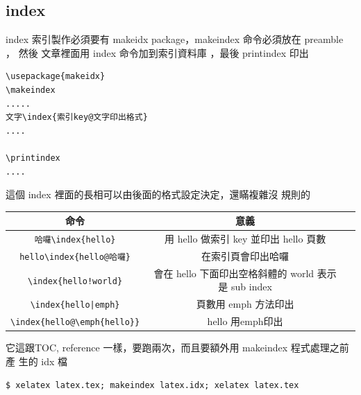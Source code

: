   \subsection{index}
  index 索引製作必須要有 makeidx package，makeindex 命令必須放在 preamble ，
  然後 文章裡面用 index 命令加到索引資料庫 ，最後 printindex 印出
  \begin{verbatim}
\usepackage{makeidx}
\makeindex
.....
文字\index{索引key@文字印出格式}
....

\printindex
....
  \end{verbatim}
  這個 index 裡面的長相可以由後面的格式設定決定，還瞞複雜沒
  規則的
  \begin{center}
  \begin{tabular}{ccp{4cm}}
    命令 & 意義 \\
    \hline
    \verb=哈囉\index{hello}= &
    用 hello \index{hello} 做索引 key 並印出 hello 頁數\\

    \verb=hello\index{hello@哈囉}= &
    在索引頁會印出哈囉\index{hello@哈囉}\\

    \verb=\index{hello!world}= &
    會在 hello 下面印出空格斜體的 world \index{hello!world} 表示是 sub index\\

    \verb=\index{hello|emph}= &
    頁數用 emph 方法印出 \index{hello|emph} \\
    \verb=\index{hello@\emph{hello}}= &
    hello 用emph印出\index{hello@\emph{hello}}\\
  \end{tabular}
  \end{center}
  \printindex
  它這跟TOC, reference 一樣，要跑兩次，而且要額外用 makeindex 程式處理之前產
  生的 idx 檔
  \begin{verbatim}
$ xelatex latex.tex; makeindex latex.idx; xelatex latex.tex
  \end{verbatim}

